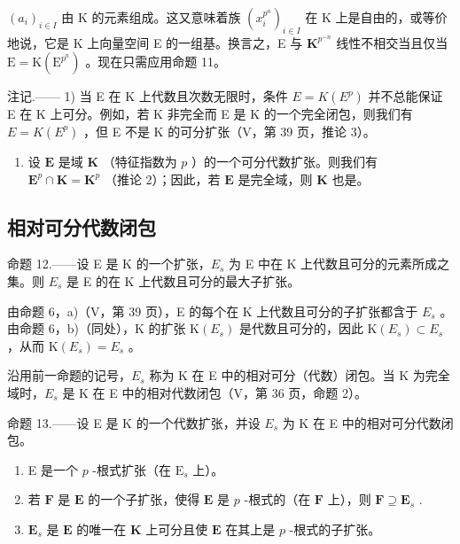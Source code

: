 \((a_{i})_{i\in I}\) 由 K 的元素组成。这又意味着族 \((x_{i}^{p^{n}})_{i\in I}\) 在 K 上是自由的，或等价地说，它是 K 上向量空间 E 的一组基。换言之，E 与 \(\mathbf{K}^{p^{-n}}\) 线性不相交当且仅当 \(\mathrm{E} = \mathrm{K}(\mathrm{E}^{p^n})\) 。现在只需应用命题 11。

注记.—— 1) 当 E 在 K 上代数且次数无限时，条件 \(E = K(E^{p})\) 并不总能保证 E 在 K 上可分。例如，若 K 非完全而 E 是 K 的一个完全闭包，则我们有 \(E = K(E^{p})\) ，但 E 不是 K 的可分扩张（V，第 39 页，推论 3）。

\begin{enumerate}
\def\labelenumi{\arabic{enumi})}
\setcounter{enumi}{1}
\tightlist
\item
  设 \(\mathbf{E}\) 是域 \(\mathbf{K}\) （特征指数为 \(p\) ）的一个可分代数扩张。则我们有 \(\mathbf{E}^p \cap \mathbf{K} = \mathbf{K}^p\) （推论 2）；因此，若 \(\mathbf{E}\) 是完全域，则 \(\mathbf{K}\) 也是。
\end{enumerate}

\subsection{相对可分代数闭包}

命题 12.——设 E 是 K 的一个扩张，\(E_{s}\) 为 E 中在 K 上代数且可分的元素所成之集。则 \(E_{s}\) 是 E 的在 K 上代数且可分的最大子扩张。

由命题 6，a)（V，第 39 页），E 的每个在 K 上代数且可分的子扩张都含于 \(E_{s}\) 。由命题 6，b)（同处），K 的扩张 \(\mathrm{K}(E_{s})\) 是代数且可分的，因此 \(\mathrm{K}(E_{s}) \subset E_{s}\) ，从而 \(\mathrm{K}(E_{s}) = E_{s}\) 。

沿用前一命题的记号，\(E_{s}\) 称为 K 在 E 中的相对可分（代数）闭包。当 K 为完全域时，\(E_{s}\) 是 K 在 E 中的相对代数闭包（V，第 36 页，命题 2）。

命题 13.——设 E 是 K 的一个代数扩张，并设 \(E_{s}\) 为 K 在 E 中的相对可分代数闭包。

\begin{enumerate}
\def\labelenumi{\alph{enumi})}
\item
  E 是一个 \(p\) -根式扩张（在 \(\mathrm{E}_s\) 上）。
\item
  若 \(\mathbf{F}\) 是 \(\mathbf{E}\) 的一个子扩张，使得 \(\mathbf{E}\) 是 \(p\) -根式的（在 \(\mathbf{F}\) 上），则 \(\mathbf{F} \supseteq \mathbf{E}_s\) .
\item
  \(\mathbf{E}_s\) 是 \(\mathbf{E}\) 的唯一在 \(\mathbf{K}\) 上可分且使 \(\mathbf{E}\) 在其上是 \(p\) -根式的子扩张。
\end{enumerate}

